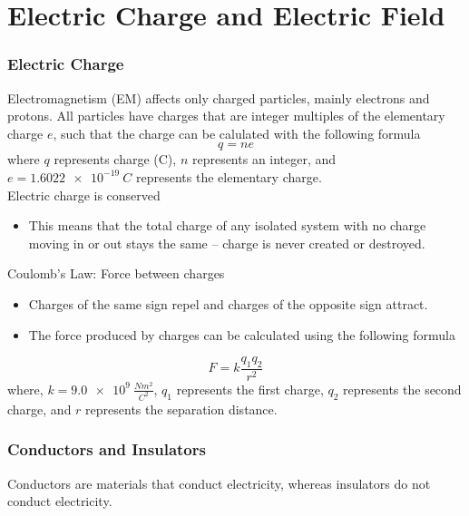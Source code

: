 \chapter{Electric Charge and Electric Field}

\subsection{Electric Charge}
Electromagnetism (EM) affects only charged particles, mainly electrons and protons. All particles have charges that are integer multiples of the elementary charge $e$, such that the charge can be calulated with the following formula
\begin{equation}
q = ne
\end{equation}
where $q$ represents charge (C), $n$ represents an integer, and $e = \SI{1.6022e-19}{C}$ represents the elementary charge.
\\

Electric charge is conserved
\begin{itemize}
\item This means that the total charge of any isolated system with no charge moving in or out stays the same -- charge is never created or destroyed. 
\end{itemize} 

Coulomb's Law: Force between charges
\begin{itemize}
\item Charges of the same sign repel and charges of the opposite sign attract.
\item The force produced by charges can be calculated using the following formula 
\end{itemize}
\begin{equation}
F = k\frac{q_1q_2}{r^2}
\end{equation}
where, $k = \SI{9.0e9}{\frac{N m^2}{C^2}}$, $q_1$ represents the first charge, $q_2$ represents the second charge, and $r$ represents the separation distance.

\subsection{Conductors and Insulators}
Conductors are materials that conduct electricity, whereas insulators do not conduct electricity. 
